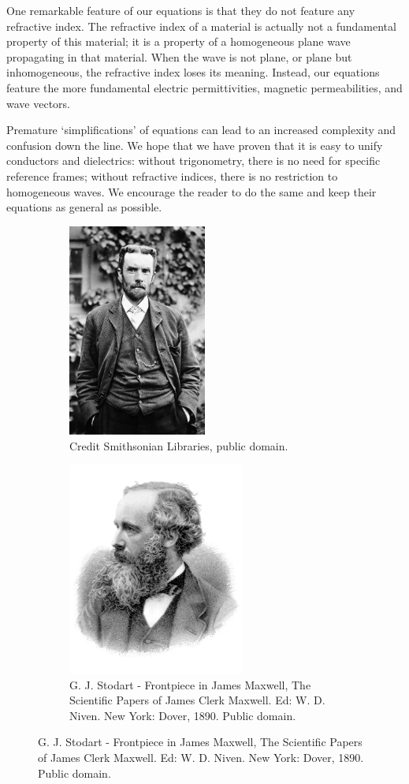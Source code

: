 One remarkable feature of our equations is that they do not feature any refractive index.
The refractive index of a material is actually not a fundamental property of this material; it is a property of a homogeneous plane wave propagating in that material.
When the wave is not plane, or plane but inhomogeneous, the refractive index loses its meaning.
Instead, our equations feature the more fundamental electric permittivities, magnetic permeabilities, and wave vectors.

Premature `simplifications' of equations can lead to an increased complexity and confusion down the line.
We hope that we have proven that it is easy to unify conductors and dielectrics:
without trigonometry, there is no need for specific reference frames;
without refractive indices, there is no restriction to homogeneous waves.
We encourage the reader to do the same and keep their equations as general as possible.

\begin{figure}[b!]
    \centering
    \begin{subfigure}[t]{.47\textwidth}
        \centering
        \includegraphics[height=7cm]{oheaviside}
        \caption*{Photograph of Oliver Heaviside, circa 1900.}
        \caption*{Credit Smithsonian Libraries, public domain.}
    \end{subfigure}
    \hfill%
    \begin{subfigure}[t]{.47\textwidth}
        \centering
        \includegraphics[height=7cm]{jamesclerkmaxwell}
        \caption*{Engraving of James Clerk Maxwell by G. J. Stodart from a photograph by Fergus of Greenock.}
        \caption*{G. J. Stodart - Frontpiece in James Maxwell, The Scientific Papers of James Clerk Maxwell. Ed: W. D. Niven. New York: Dover, 1890.  Public domain.}
    \end{subfigure}%
\end{figure}
